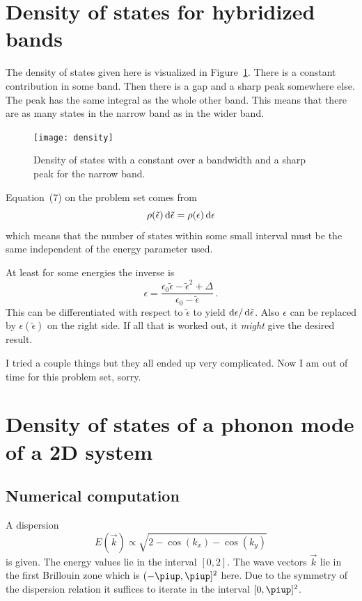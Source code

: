 \documentclass[11pt, english, fleqn, DIV=15, headinclude, BCOR=1cm]{scrartcl}
\begin{document}
\section{Density of states for hybridized bands}
\label{homework:2}

The density of states given here is visualized in Figure~\ref{fig:density}.
There is a constant contribution in some band. Then there is a gap and a sharp
peak somewhere else. The peak has the same integral as the whole other band.
This means that there are as many states in the narrow band as in the wider
band.

\begin{figure}
    \centering
    \texttt{[image: density]}
    \caption{%
        Density of states with a constant over a bandwidth and a sharp peak for
        the narrow band.
    }
    \label{fig:density}
\end{figure}

Equation~(7) on the problem set comes from
\[
    \rho(\tilde\epsilon) \mathop{}\!\mathrm d \tilde\epsilon = \rho(\epsilon) \mathop{}\!\mathrm d \epsilon
\]
which means that the number of states within some small interval must be the
same independent of the energy parameter used.

At least for some energies the inverse is
\[
    \epsilon = \frac{\epsilon_0 \tilde \epsilon - \tilde\epsilon^2 +
    \Delta}{\epsilon_0 - \tilde \epsilon} \,.
\]
This can be differentiated with respect to $\tilde\epsilon$ to yield $\mathop{}\!\mathrm d
\epsilon/ \mathop{}\!\mathrm d \tilde\epsilon$. Also $\epsilon$ can be replaced by
$\epsilon(\tilde\epsilon)$ on the right side. If all that is worked out, it
\emph{might} give the desired result.

I tried a couple things but they all ended up very complicated. Now I am out of
time for this problem set, sorry.

\section{Density of states of a phonon mode of a 2D system}
\label{homework:3}

\subsection{Numerical computation}

A dispersion
\[
    E(\vec k) \propto \sqrt{2 - \cos(k_x) - \cos(k_y)}
\]
is given. The energy values lie in the interval $[0, 2]$. The wave vectors
$\vec k$ lie in the first Brillouin zone which is $(-\piup, \piup]^2$ here. Due
to the symmetry of the dispersion relation it suffices to iterate in the
interval $[0, \piup]^2$.
\end{document}
